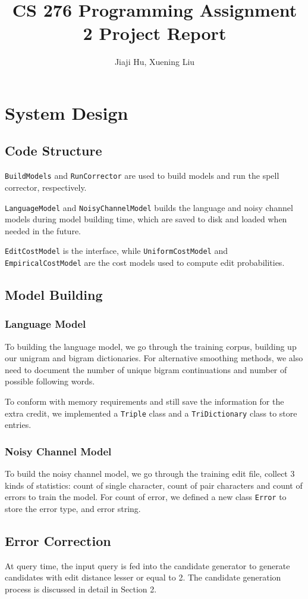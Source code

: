 \documentclass[10pt,twocolumn]{article}
\begin{document}
\title{CS 276 Programming Assignment 2 Project Report}
\author{Jiaji Hu, Xuening Liu}
\date{}
\maketitle
\section{System Design}
\subsection{Code Structure}
\texttt{BuildModels} and \texttt{RunCorrector} are used to build models and run the spell corrector, respectively.

\texttt{LanguageModel} and \texttt{NoisyChannelModel} builds the language and noisy channel models during model building time, which are saved to disk and loaded when needed in the future.

\texttt{EditCostModel} is the interface, while \texttt{UniformCostModel} and \texttt{EmpiricalCostModel} are the cost models used to compute edit probabilities.
\subsection{Model Building}
\subsubsection{Language Model}
To building the language model, we go through the training corpus, building up our unigram and bigram dictionaries. For alternative smoothing methods, we also need to document the number of unique bigram continuations and number of possible following words.

To conform with memory requirements and still save the information for the extra credit, we implemented a \texttt{Triple} class and a \texttt{TriDictionary} class to store entries.
\subsubsection{Noisy Channel Model}
To build the noisy channel model, we go through the training edit file, collect 3 kinds of statistics: count of single character, count of pair characters and count of errors to train the model. For count of error, we defined a new class \texttt{Error} to store the error type, and error string.

\subsection{Error Correction}
At query time, the input query is fed into the candidate generator to generate candidates with edit distance lesser or equal to 2. The candidate generation process is discussed in detail in Section 2.
\end{document}
